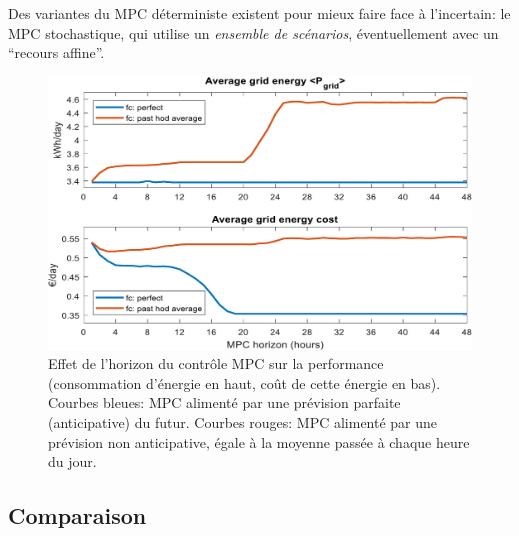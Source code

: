 \documentclass[a4paper,10pt,twocolumn]{article}
\begin{document}
Des variantes du MPC déterministe existent pour mieux faire face à l'incertain: le MPC stochastique,
qui utilise un \emph{ensemble de scénarios}, éventuellement avec un ``recours affine''.

\begin{figure}[!ht]
        \begin{center}
                \includegraphics[width=1\columnwidth]{figures/MPC_horizon_effect.pdf}
        \end{center}

        \caption{Effet de l'horizon du contrôle MPC sur la performance (consommation d'énergie en haut, coût de cette énergie en bas).
        Courbes bleues: MPC alimenté par une prévision parfaite (anticipative) du futur.
        Courbes rouges: MPC alimenté par une prévision non anticipative, égale à la moyenne passée à chaque heure du jour. 
        }
        \label{fig:mpc_horiz}
\end{figure}



% 
% 

\subsection{Comparaison}
\end{document}
